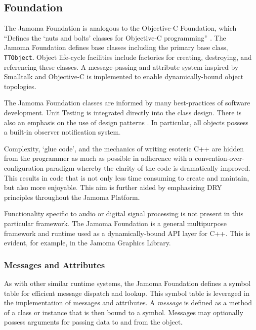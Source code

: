 \documentclass[twoside,10pt]{article}
\begin{document}
\subsection{Foundation} %

The Jamoma Foundation \cite{web7} is analogous to the Objective-C Foundation, which ``Defines the `nuts and bolts' classes for Objective-C programming'' \cite{web8}.  The Jamoma Foundation defines base classes including the primary base class, \texttt{\small{TTObject}}.  Object life-cycle facilities include factories for creating, destroying, and referencing these classes.  A message-passing and attribute system inspired by Smalltalk and Objective-C is implemented to enable dynamically-bound object topologies.  

The Jamoma Foundation classes are informed by many best-practices of software development.  Unit Testing is integrated directly into the class design.  There is also an emphasis on the use of design patterns \cite{Gamma:1995}.  In particular, all objects possess a built-in observer notification system.  

Complexity, `glue code', and the mechanics of writing esoteric C++ are hidden from the programmer as much as possible in adherence with a convention-over-configuration paradigm whereby the clarity of the code is dramatically improved.  This results in code that is not only less time consuming to create and maintain, but also more enjoyable.  This aim is further aided by emphasizing DRY principles throughout the Jamoma Platform.

Functionality specific to audio or digital signal processing is not present in this particular framework.  The Jamoma Foundation is a general multipurpose framework and runtime used as a dynamically-bound API layer for C++.  This is evident, for example, in the Jamoma Graphics Library.

\subsubsection{Messages and Attributes} %

As with other similar runtime systems, the Jamoma Foundation defines a symbol table for efficient message dispatch and lookup.  This symbol table is leveraged in the implementation of messages and attributes.  
A \emph{message} is defined as a method of a class or instance that is then bound to a symbol.  Messages may optionally possess arguments for passing data to and from the object.
\end{document}
